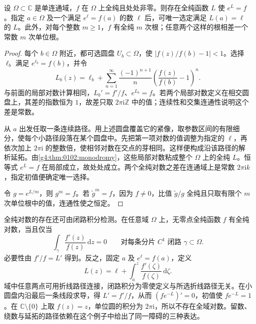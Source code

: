 \begin{proposition}\label{g4:prop:0102:logarithm}
	设 \(\Omega\subset\mathbb C\) 是单连通域，\(f\) 在 \(\Omega\) 上全纯且处处非零。则存在全纯函数 \(L\) 使 \(e^L=f\)。指定 \(a\in\Omega\) 及一个满足 \(e^\ell=f(a)\) 的数 \(\ell\) 后，可唯一选定满足 \(L(a)=\ell\) 的 \(L\)。此外，对每个整数 \(m\geq1\)，\(f\) 有全纯 \(m\) 次根；任意两个这样的根相差一个常数 \(m\) 次单位根。
\end{proposition}
\begin{proof}
	每个 \(b\in\Omega\) 附近，都可选圆盘 \(U_b\subset\Omega\)，使 \(|f(z)/f(b)-1|<1\)。选择 \(\ell_b\) 满足 \(e^{\ell_b}=f(b)\)，并令
	\[
		L_b(z)=\ell_b+\sum_{n=1}^{\infty}\frac{(-1)^{n+1}}n
		\left(\frac{f(z)}{f(b)}-1\right)^n.
	\]
	与前面的局部对数计算相同，\(L_b'=f'/f\)、\(e^{L_b}=f\)。若两个局部对数定义在相交圆盘上，其差的指数恒为 \(1\)，故差只取 \(2\pi\mathrm{i}\mathbb Z\) 中的值；连续性和交集连通性说明这个差是常数。

	从 \(a\) 出发任取一条连续路径。用上述圆盘覆盖它的紧像，取参数区间的有限细分，使每个小路径段落在某个圆盘中。先把第一项对数的值调整为指定的 \(\ell\)，再依次加上 \(2\pi\mathrm{i}\) 的整数倍，使相邻对数在交点的芽相同。这样便构成沿该路径的解析延拓。由\cref{g4:thm:0102:monodromy}，这些局部对数粘成整个 \(\Omega\) 上的全纯 \(L\)。恒等式 \(e^L=f\) 在局部成立，故处处成立。两个全纯对数之差在连通域上是常数 \(2\pi\mathrm{i}k\)，指定初值便确定唯一选择。

	令 \(g=e^{L/m}\)，则 \(g^m=f\)。若 \(\widetilde g^m=f\)，因为 \(f\neq0\)，比值 \(\widetilde g/g\) 全纯且只取有限个 \(m\) 次单位根中的值，连通性使之恒定。
\end{proof}

全纯对数的存在还可由闭路积分检测。在任意域 \(\Omega\) 上，无零点全纯函数 \(f\) 有全纯对数，当且仅当
\[
	\int_\gamma\frac{f'(z)}{f(z)}\,\mathrm{d}z=0
	\qquad\text{对每条分片 }C^1\text{ 闭路 }\gamma\subset\Omega.
\]
必要性由 \(f'/f=L'\) 得到。反之，固定 \(a\) 及 \(e^\ell=f(a)\)，定义
\[
	L(z)=\ell+\int_a^z\frac{f'(\zeta)}{f(\zeta)}\,\mathrm{d}\zeta.
\]
域中任意两点可用折线路径连接，闭路积分为零使定义与所选折线路径无关。在小圆盘内沿最后一条线段求导，得 \(L'=f'/f\)，从而 \((fe^{-L})'=0\)，初值使 \(fe^{-L}=1\)。在 \(\mathbb C\setminus\{0\}\) 上取 \(f(z)=z\)，单位圆的积分为 \(2\pi\mathrm{i}\)，所以不存在全域对数。留数、绕数与延拓的路径依赖在这个例子中给出了同一障碍的三种表达。
